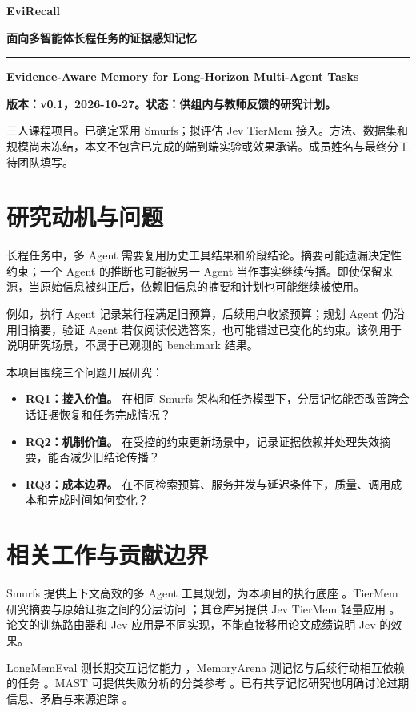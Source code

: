 \documentclass[UTF8,a4paper,zihao=5]{ctexart}
\begin{document}
{\color{accent}\LARGE\bfseries EviRecall}\par
{\large\bfseries 面向多智能体长程任务的证据感知记忆}\par
\vspace{4pt}\hrule\vspace{7pt}
\textbf{Evidence-Aware Memory for Long-Horizon Multi-Agent Tasks}

\textbf{版本：v0.1，2026-10-27。状态：供组内与教师反馈的研究计划。}

三人课程项目。已确定采用 Smurfs；拟评估 Jev TierMem 接入。方法、数据集和规模尚未冻结，本文不包含已完成的端到端实验或效果承诺。成员姓名与最终分工待团队填写。

\section{研究动机与问题}
长程任务中，多 Agent 需要复用历史工具结果和阶段结论。摘要可能遗漏决定性约束；一个 Agent 的推断也可能被另一 Agent 当作事实继续传播。即使保留来源，当原始信息被纠正后，依赖旧信息的摘要和计划也可能继续被使用。

例如，执行 Agent 记录某行程满足旧预算，后续用户收紧预算；规划 Agent 仍沿用旧摘要，验证 Agent 若仅阅读候选答案，也可能错过已变化的约束。该例用于说明研究场景，不属于已观测的 benchmark 结果。

本项目围绕三个问题开展研究：

\begin{itemize}
\item \textbf{RQ1：接入价值。} 在相同 Smurfs 架构和任务模型下，分层记忆能否改善跨会话证据恢复和任务完成情况？
\item \textbf{RQ2：机制价值。} 在受控的约束更新场景中，记录证据依赖并处理失效摘要，能否减少旧结论传播？
\item \textbf{RQ3：成本边界。} 在不同检索预算、服务并发与延迟条件下，质量、调用成本和完成时间如何变化？
\end{itemize}
\section{相关工作与贡献边界}
Smurfs 提供上下文高效的多 Agent 工具规划，为本项目的执行底座 \cite{smurfs2025}。TierMem 研究摘要与原始证据之间的分层访问 \cite{tiermem2026}；其仓库另提供 Jev TierMem 轻量应用 \cite{jev2026}。论文的训练路由器和 Jev 应用是不同实现，不能直接移用论文成绩说明 Jev 的效果。

LongMemEval 测长期交互记忆能力 \cite{longmemeval2025}，MemoryArena 测记忆与后续行动相互依赖的任务 \cite{memoryarena2026}。MAST 可提供失败分析的分类参考 \cite{mast2025}。已有共享记忆研究也明确讨论过期信息、矛盾与来源追踪 \cite{governed2026}。
\end{document}
